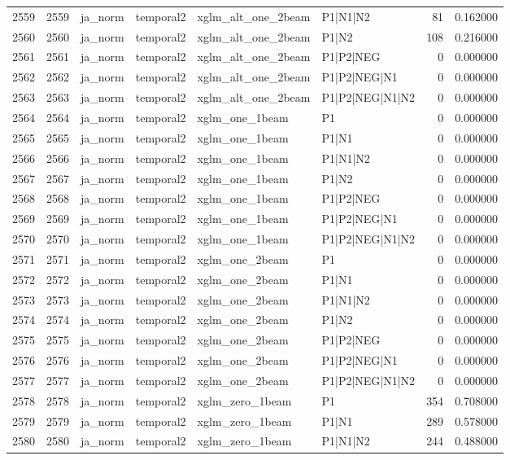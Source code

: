 \begin{tabular}{lrllllrr}
2559 & 2559 & ja_norm & temporal2 & xglm_alt_one_2beam & P1|N1|N2 & 81 & 0.162000 \\
2560 & 2560 & ja_norm & temporal2 & xglm_alt_one_2beam & P1|N2 & 108 & 0.216000 \\
2561 & 2561 & ja_norm & temporal2 & xglm_alt_one_2beam & P1|P2|NEG & 0 & 0.000000 \\
2562 & 2562 & ja_norm & temporal2 & xglm_alt_one_2beam & P1|P2|NEG|N1 & 0 & 0.000000 \\
2563 & 2563 & ja_norm & temporal2 & xglm_alt_one_2beam & P1|P2|NEG|N1|N2 & 0 & 0.000000 \\
2564 & 2564 & ja_norm & temporal2 & xglm_one_1beam & P1 & 0 & 0.000000 \\
2565 & 2565 & ja_norm & temporal2 & xglm_one_1beam & P1|N1 & 0 & 0.000000 \\
2566 & 2566 & ja_norm & temporal2 & xglm_one_1beam & P1|N1|N2 & 0 & 0.000000 \\
2567 & 2567 & ja_norm & temporal2 & xglm_one_1beam & P1|N2 & 0 & 0.000000 \\
2568 & 2568 & ja_norm & temporal2 & xglm_one_1beam & P1|P2|NEG & 0 & 0.000000 \\
2569 & 2569 & ja_norm & temporal2 & xglm_one_1beam & P1|P2|NEG|N1 & 0 & 0.000000 \\
2570 & 2570 & ja_norm & temporal2 & xglm_one_1beam & P1|P2|NEG|N1|N2 & 0 & 0.000000 \\
2571 & 2571 & ja_norm & temporal2 & xglm_one_2beam & P1 & 0 & 0.000000 \\
2572 & 2572 & ja_norm & temporal2 & xglm_one_2beam & P1|N1 & 0 & 0.000000 \\
2573 & 2573 & ja_norm & temporal2 & xglm_one_2beam & P1|N1|N2 & 0 & 0.000000 \\
2574 & 2574 & ja_norm & temporal2 & xglm_one_2beam & P1|N2 & 0 & 0.000000 \\
2575 & 2575 & ja_norm & temporal2 & xglm_one_2beam & P1|P2|NEG & 0 & 0.000000 \\
2576 & 2576 & ja_norm & temporal2 & xglm_one_2beam & P1|P2|NEG|N1 & 0 & 0.000000 \\
2577 & 2577 & ja_norm & temporal2 & xglm_one_2beam & P1|P2|NEG|N1|N2 & 0 & 0.000000 \\
2578 & 2578 & ja_norm & temporal2 & xglm_zero_1beam & P1 & 354 & 0.708000 \\
2579 & 2579 & ja_norm & temporal2 & xglm_zero_1beam & P1|N1 & 289 & 0.578000 \\
2580 & 2580 & ja_norm & temporal2 & xglm_zero_1beam & P1|N1|N2 & 244 & 0.488000 \\

\end{tabular}
